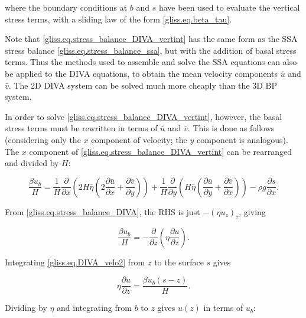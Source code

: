 {\noindent
where the boundary conditions at $b$ and $s$ have been used to evaluate the vertical stress terms,
with a sliding law of the form \eqref{gliss.eq.beta_tau}.

Note that \eqref{gliss.eq.stress_balance_DIVA_vertint} has the same form as the SSA
stress balance \eqref{gliss.eq.stress_balance_ssa}, but with the addition of basal stress terms.
Thus the methods used to assemble and solve the SSA equations can also be applied
to the DIVA equations, to obtain the mean velocity components $\bar{u}$ and $\bar{v}$.
The 2D DIVA system can be solved much more cheaply than the 3D BP system.

In order to solve \eqref{gliss.eq.stress_balance_DIVA_vertint}, however, the basal stress terms must be rewritten
in terms of $\bar{u}$ and $\bar{v}$. This is done as follows (considering only the $x$ component
of velocity; the $y$ component is analogous).
The $x$ component of \eqref{gliss.eq.stress_balance_DIVA_vertint} can be rearranged and
divided by $H$:

\begin{equation}
  \label{gliss.eq.DIVA.velo1}
  \frac {\beta u_b}{H} =
     \frac{1}{H} \frac{\partial }{\partial x}\left( 2H \bar{\eta} \left(2\frac{\partial \bar{u}}{\partial x} + \frac{\partial \bar{v}}{\partial y} \right) \right) 
   + \frac{1}{H} \frac{\partial }{\partial y}\left(  H \bar{\eta} \left( \frac{\partial \bar{u}}{\partial y} + \frac{\partial \bar{v}}{\partial x} \right) \right) 
   - \rho g \frac{\partial s}{\partial x}.
\end{equation}

\noindent
From \eqref{gliss.eq.stress_balance_DIVA}, the RHS is just $-(\eta u_z)_z$, giving

\begin{equation}
  \label{gliss.eq.DIVA_velo2}
  \frac{\beta u_b}{H} = -\frac{\partial }{\partial z}\left( \eta \frac{\partial u}{\partial z} \right).
\end{equation}

\noindent
Integrating \eqref{gliss.eq.DIVA_velo2} from $z$ to the surface $s$ gives

\begin{equation}
  \label{gliss.eq.DIVA_velo3}
  \eta \frac{\partial u}{\partial z} = \frac{\beta {{u}_{b}}\left( s-z \right)}{H}.
\end{equation}

\noindent
Dividing by $\eta$ and integrating from $b$ to $z$ gives $u(z)$
in terms of $u_b$:

}
